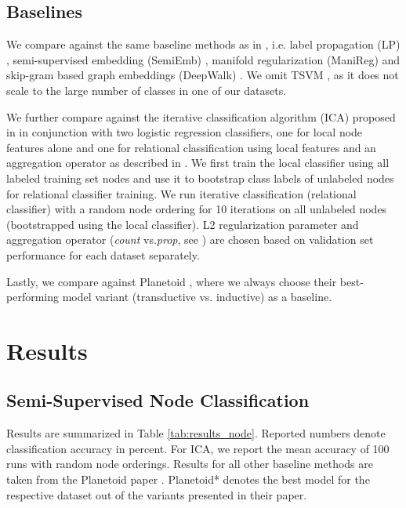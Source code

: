 \documentclass{article} \usepackage{iclr2017_conference,times}
\makeatletter
\newcommand*{\ie}{i.e.\@\xspace}
\newcommand*{\vs}{vs.\@\xspace}
\makeatother
\begin{document}
\subsection{Baselines}

We compare against the same baseline methods as in \cite{yang2016revisiting}, \ie label propagation (LP) \citep{zhu2003semi}, semi-supervised embedding (SemiEmb) \citep{weston2012deep}, manifold regularization (ManiReg) \citep{belkin2006manifold} and skip-gram based graph embeddings (DeepWalk) \citep{perozzi2014deepwalk}. We omit TSVM \citep{joachims1999transductive}, as it does not scale to the large number of classes in one of our datasets.

We further compare against the iterative classification algorithm (ICA) proposed in \cite{lu2003link} in conjunction with two logistic regression classifiers, one for local node features alone and one for relational classification using local features and an aggregation operator as described in \cite{sen2008collective}. We first train the local classifier using all labeled training set nodes and use it to bootstrap class labels of unlabeled nodes for relational classifier training. We run iterative classification (relational classifier) with a random node ordering for 10 iterations on all unlabeled nodes (bootstrapped using the local classifier). L2 regularization parameter and aggregation operator (\textit{count} \vs \textit{prop}, see \cite{sen2008collective}) are chosen based on validation set performance for each dataset separately.

Lastly, we compare against Planetoid \citep{yang2016revisiting}, where we always choose their best-performing model variant (transductive \vs inductive) as a baseline.

\section{Results}
\label{sec:results}

\subsection{Semi-Supervised Node Classification}
Results are summarized in Table \ref{tab:results_node}. Reported numbers denote classification accuracy in percent. For ICA, we report the mean accuracy of 100 runs with random node orderings. Results for all other baseline methods are taken from the Planetoid paper \citep{yang2016revisiting}. Planetoid* denotes the best model for the respective dataset out of the variants presented in their paper.
\end{document}
